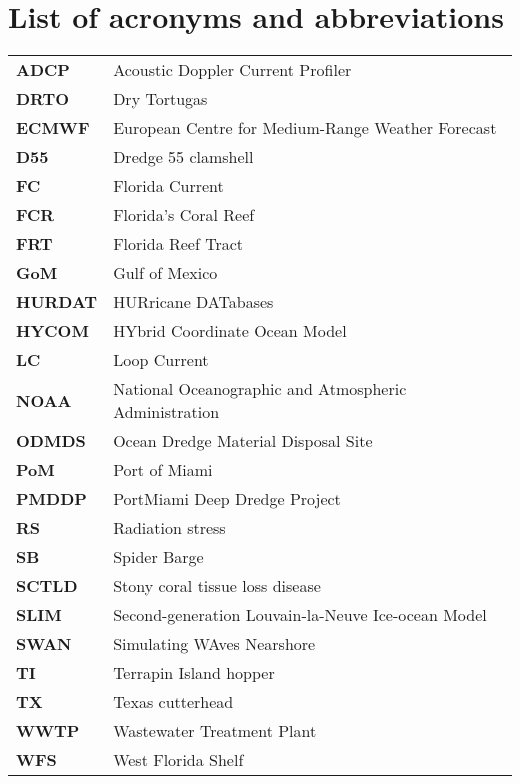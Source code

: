 
\begingroup
\setlength{\beforechapskip}{5pt}
\setlength{\tabcolsep}{10pt}
\chapter{List of acronyms and abbreviations}



\begin{tabular}{lp{7.5cm}}
	\textbf{ADCP}   & Acoustic Doppler Current Profiler\\
	\textbf{DRTO}   & Dry Tortugas \\
	\textbf{ECMWF}  & European Centre for Medium-Range Weather Forecast \\
	\textbf{D55}    & Dredge 55 clamshell \\
	\textbf{FC}     & Florida Current \\
	\textbf{FCR}    & Florida's Coral Reef \\
	\textbf{FRT}    & Florida Reef Tract  \\
	\textbf{GoM}    & Gulf of Mexico \\
	\textbf{HURDAT} & HURricane DATabases \\
	\textbf{HYCOM}  & HYbrid Coordinate Ocean Model \\
	\textbf{LC}     & Loop Current \\
	\textbf{NOAA}   & National Oceanographic and Atmospheric Administration \\
	\textbf{ODMDS}	& Ocean Dredge Material Disposal Site \\
	\textbf{PoM}    & Port of Miami \\
	\textbf{PMDDP}  & PortMiami Deep Dredge Project \\
	\textbf{RS}     & Radiation stress \\
	\textbf{SB}     & Spider Barge \\
	\textbf{SCTLD}  & Stony coral tissue loss disease \\
	\textbf{SLIM}   & Second-generation Louvain-la-Neuve Ice-ocean Model\\
	\textbf{SWAN}   & Simulating WAves Nearshore \\
	\textbf{TI}     & Terrapin Island hopper \\
	\textbf{TX}     & Texas cutterhead \\
	\textbf{WWTP}	& Wastewater Treatment Plant \\
	\textbf{WFS}    & West Florida Shelf
\end{tabular}